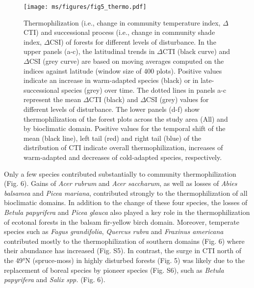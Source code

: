 \documentclass[
  a4paperpaper,
]{article}
\begin{document}
\begin{figure}
\centering
\texttt{[image: ms/figures/fig5\_thermo.pdf]}
\caption{Thermophilization (i.e., change in community temperature index,
\(\Delta\)CTI) and successional process (i.e., change in community shade
index, \(\Delta\)CSI) of forests for different levels of disturbance. In
the upper panels (a-c), the latitudinal trends in \(\Delta\)CTI (black
curve) and \(\Delta\)CSI (grey curve) are based on moving averages
computed on the indices against latitude (window size of 400 plots).
Positive values indicate an increase in warm-adapted species (black) or
in late-successional species (grey) over time. The dotted lines in
panels a-c represent the mean \(\Delta\)CTI (black) and \(\Delta\)CSI
(grey) values for different levels of disturbance. The lower panels
(d-f) show thermophilization of the forest plots across the study area
(All) and by bioclimatic domain. Positive values for the temporal shift
of the mean (black line), left tail (red) and right tail (blue) of the
distribution of CTI indicate overall thermophilization, increases of
warm‐adapted and decreases of cold‐adapted species, respectively.}
\end{figure}

Only a few species contributed substantially to community
thermophilization (Fig. 6). Gains of \emph{Acer rubrum} and \emph{Acer
saccharum}, as well as losses of \emph{Abies balsamea} and \emph{Picea
mariana}, contributed strongly to the thermophilization of all
bioclimatic domains. In addition to the change of these four species,
the losses of \emph{Betula papyrifera} and \emph{Picea glauca} also
played a key role in the thermophilization of ecotonal forests in the
balsam fir-yellow birch domain. Moreover, temperate species such as
\emph{Fagus grandifolia}, \emph{Quercus rubra} and \emph{Fraxinus
americana} contributed mostly to the thermophilization of southern
domains (Fig. 6) where their abundance has increased (Fig. S5). In
contrast, the surge in CTI north of the 49°N (spruce-moss) in highly
disturbed forests (Fig. 5) was likely due to the replacement of boreal
species by pioneer species (Fig. S6), such as \emph{Betula papyrifera}
and \emph{Salix spp.} (Fig. 6).
\end{document}
